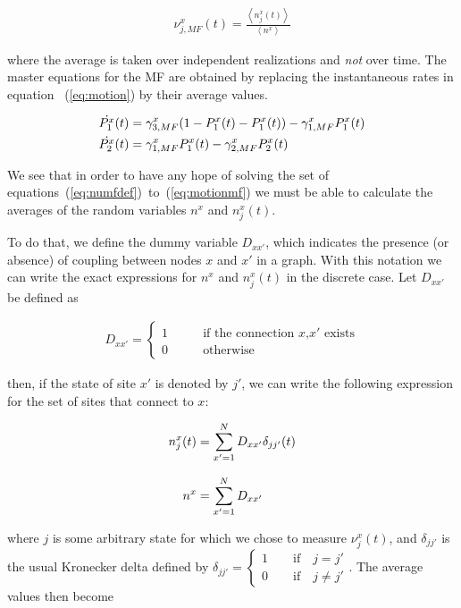 \begin{align}
    \nu^x_{j,MF}(t) = \frac{\left< n^x_j(t) \right>}{\left< n^x \right>}
    \label{eq:numfdef}
\end{align}

\noindent where the average is taken over independent realizations and \textit{not} over time. The master equations for the MF are
obtained by replacing the instantaneous rates in equation~ (\ref{eq:motion}) by their average values.

\begin{align}
    \dot{P_1^x}(t) &= \gamma^x_{3,MF} (1-P_1^x(t)-P_1^x(t)) - \gamma^x_{1,MF} P_1^x(t) \notag \\
    \dot{P_2^x}(t) &= \gamma^x_{1,MF}  P_1^x(t) - \gamma^x_{2,MF} P_2^x(t)
    \label{eq:motionmf}
\end{align}

We see that in order to have any hope of solving the set of equations~(\ref{eq:numfdef})~to~(\ref{eq:motionmf}) we must be able to
calculate the averages of the random variables $n^x$ and $n^x_j(t)$.

To do that, we define the dummy variable $D_{xx'}$, which indicates the presence (or absence) of coupling between nodes $x$ and $x'$ in
a graph. With this notation we can write the exact expressions for $n^x$ and $n^x_j(t)$ in the discrete case. Let $D_{xx'}$ be defined
as

\begin{align}
    D_{xx'} = 
    \begin{cases}
        1 \qquad &\text{if the connection $x$,$x'$ exists}\\
        0 \qquad &\text{otherwise}
    \end{cases}
\end{align}

\noindent then, if the state of site $x'$ is denoted by $j'$, we can write the following expression for the set of sites that connect
to $x$:

\begin{align}
    n^x_j(t) &= \sum\limits_{x'=1}^ND_{xx'}\delta_{jj'}(t) \notag\\[8pt]
    n^x &= \sum\limits_{x'=1}^ND_{xx'}
\end{align}

\noindent where $j$ is some arbitrary state for which we chose to measure $\nu^x_j(t)$, and $\delta_{jj'}$ is the usual Kronecker delta
defined by $\delta_{jj'}=\begin{cases}1 \qquad\text{if}\quad j=j'\\0 \qquad \text{if}\quad j\neq j'\end{cases}$. The average values
then become

